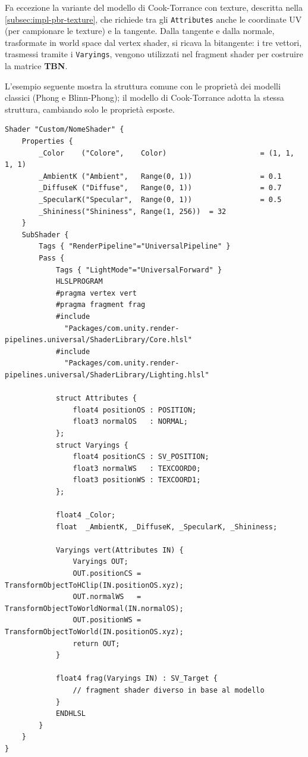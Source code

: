 \documentclass[12pt,a4paper,twoside]{book}
\begin{document}
Fa eccezione la variante del modello di Cook-Torrance con texture, descritta nella \cref{subsec:impl-pbr-texture}, che richiede tra gli \texttt{Attributes} anche le coordinate UV (per campionare le texture) e la tangente. Dalla tangente e dalla normale, trasformate in world space dal vertex shader, si ricava la bitangente: i tre vettori, trasmessi tramite i \texttt{Varyings}, vengono utilizzati nel fragment shader per costruire la matrice \textbf{TBN}.

L'esempio seguente mostra la struttura comune con le proprietà dei modelli classici (Phong e Blinn-Phong); il modello di Cook-Torrance adotta la stessa struttura, cambiando solo le proprietà esposte.

\begin{minipage}{\textwidth}
\begin{lstlisting}[style=hlsl,
    caption={Struttura comune degli shader per i modelli classici.},
    label={lst:common-structure}]
Shader "Custom/NomeShader" {
    Properties {
        _Color    ("Colore",    Color)                      = (1, 1, 1, 1)
        _AmbientK ("Ambient",   Range(0, 1))                = 0.1
        _DiffuseK ("Diffuse",   Range(0, 1))                = 0.7
        _SpecularK("Specular",  Range(0, 1))                = 0.5
        _Shininess("Shininess", Range(1, 256))  = 32
    }
    SubShader {
        Tags { "RenderPipeline"="UniversalPipeline" }
        Pass {
            Tags { "LightMode"="UniversalForward" }
            HLSLPROGRAM
            #pragma vertex vert
            #pragma fragment frag
            #include
              "Packages/com.unity.render-pipelines.universal/ShaderLibrary/Core.hlsl"
            #include
              "Packages/com.unity.render-pipelines.universal/ShaderLibrary/Lighting.hlsl"

            struct Attributes {
                float4 positionOS : POSITION;
                float3 normalOS   : NORMAL;
            };
            struct Varyings {
                float4 positionCS : SV_POSITION;
                float3 normalWS   : TEXCOORD0;
                float3 positionWS : TEXCOORD1;
            };

            float4 _Color;
            float  _AmbientK, _DiffuseK, _SpecularK, _Shininess;

            Varyings vert(Attributes IN) {
                Varyings OUT;
                OUT.positionCS = TransformObjectToHClip(IN.positionOS.xyz);
                OUT.normalWS   = TransformObjectToWorldNormal(IN.normalOS);
                OUT.positionWS = TransformObjectToWorld(IN.positionOS.xyz);
                return OUT;
            }

            float4 frag(Varyings IN) : SV_Target {
                // fragment shader diverso in base al modello
            }
            ENDHLSL
        }
    }
}
\end{lstlisting}
\end{minipage}
\end{document}
